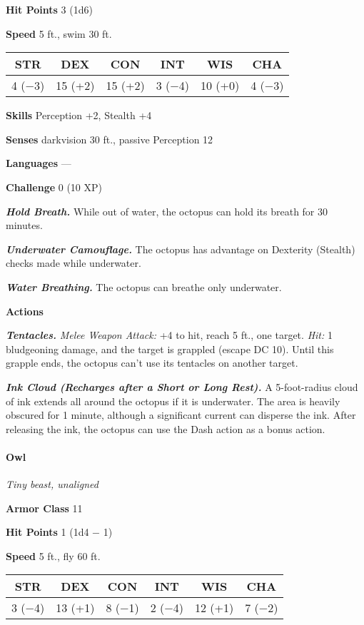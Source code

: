 \documentclass[
]{article}
\begin{document}
\textbf{Hit Points} 3 (1d6)

\textbf{Speed} 5 ft., swim 30 ft.

\begin{longtable}[]{@{}cccccc@{}}
\toprule
STR & DEX & CON & INT & WIS & CHA\tabularnewline
\midrule
\endhead
4 (−3) & 15 (+2) & 15 (+2) & 3 (−4) & 10 (+0) & 4 (−3)\tabularnewline
\bottomrule
\end{longtable}

\textbf{Skills} Perception +2, Stealth +4

\textbf{Senses} darkvision 30 ft., passive Perception 12

\textbf{Languages} ---

\textbf{Challenge} 0 (10 XP)

\emph{\textbf{Hold Breath.}} While out of water, the octopus can hold
its breath for 30 minutes.

\emph{\textbf{Underwater Camouflage.}} The octopus has advantage on
Dexterity (Stealth) checks made while underwater.

\emph{\textbf{Water Breathing.}} The octopus can breathe only
underwater.

\textbf{Actions}

\emph{\textbf{Tentacles.}} \emph{Melee Weapon Attack:} +4 to hit, reach
5 ft., one target. \emph{Hit:} 1 bludgeoning damage, and the target is
grappled (escape DC 10). Until this grapple ends, the octopus can't use
its tentacles on another target.

\emph{\textbf{Ink Cloud (Recharges after a Short or Long Rest).}} A
5-foot-radius cloud of ink extends all around the octopus if it is
underwater. The area is heavily obscured for 1 minute, although a
significant current can disperse the ink. After releasing the ink, the
octopus can use the Dash action as a bonus action.

\hypertarget{owl}{%
\paragraph{Owl}\label{owl}}

\emph{Tiny beast, unaligned}

\textbf{Armor Class} 11

\textbf{Hit Points} 1 (1d4 − 1)

\textbf{Speed} 5 ft., fly 60 ft.

\begin{longtable}[]{@{}cccccc@{}}
\toprule
STR & DEX & CON & INT & WIS & CHA\tabularnewline
\midrule
\endhead
3 (−4) & 13 (+1) & 8 (−1) & 2 (−4) & 12 (+1) & 7 (−2)\tabularnewline
\bottomrule
\end{longtable}
\end{document}

